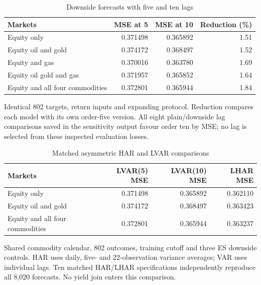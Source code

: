 \documentclass[11pt,letterpaper]{article}
\begin{document}
\begin{table}[H]
\centering
\caption{Downside forecasts with five and ten lags}\label{tab:lagforecast}
\small
\begin{tabular}{p{2.6in}rrr}
\toprule
Markets & MSE at 5 & MSE at 10 & Reduction (\%) \\
\midrule
Equity only & 0.371498 & 0.365892 & 1.51 \\
Equity oil and gold & 0.374172 & 0.368497 & 1.52 \\
Equity and gas & 0.370016 & 0.363780 & 1.69 \\
Equity oil gold and gas & 0.371957 & 0.365852 & 1.64 \\
Equity and all four commodities & 0.372801 & 0.365944 & 1.84 \\
\bottomrule
\end{tabular}
\end{table}
{\footnotesize Identical 802 targets, return inputs and expanding protocol. Reduction compares each model with its own order-five version. All eight plain/downside lag comparisons saved in the sensitivity output favour order ten by MSE; no lag is selected from these inspected evaluation losses.\par}

\begin{table}[H]
\centering
\caption{Matched asymmetric HAR and LVAR comparisons}\label{tab:har}
\small
\begin{tabular}{p{2.6in}rrr}
\toprule
Markets & LVAR(5) MSE & LVAR(10) MSE & LHAR MSE \\
\midrule
Equity only & 0.371498 & 0.365892 & 0.362110 \\
Equity oil and gold & 0.374172 & 0.368497 & 0.363423 \\
Equity and all four commodities & 0.372801 & 0.365944 & 0.363237 \\
\bottomrule
\end{tabular}
\end{table}
{\footnotesize Shared commodity calendar, 802 outcomes, training cutoff and three ES downside controls. HAR uses daily, five- and 22-observation variance averages; VAR uses individual lags. Ten matched HAR/LHAR specifications independently reproduce all 8,020 forecasts. No yield join enters this comparison.\par}
\end{document}
